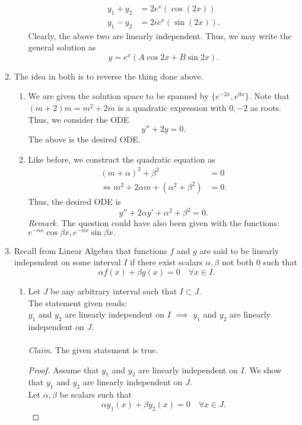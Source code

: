 \documentclass{article}
\begin{document}
\begin{enumerate}[label = Q.\arabic*.]
\begin{enumerate}[label = (\roman*)]
\begin{align*}
			y_1 + y_2 &= 2e^x(\cos(2x))\\
			y_1 - y_2 &= 2ie^x(\sin(2x)).
		\end{align*}
		Clearly, the above two are linearly independent. Thus, we may write the general solution as
		\[y = e^x(A\cos2x + B\sin 2x).\]
	\end{enumerate}
	\item The idea in both is to reverse the thing done above.
	\begin{enumerate}[label = (\roman*)] 
		\item We are given the solution space to be spanned by $\{e^{-2x}, e^{0x}\}.$ Note that $(m + 2)m = m^2 + 2m$ is a quadratic expression with $0, -2$ as roots. Thus, we consider the ODE
		\[y'' + 2y = 0.\]
		The above is the desired ODE.
		\item Like before, we construct the quadratic equation as
		\begin{align*} 
			(m + \alpha)^2 + \beta^2 &= 0\\
			\iff m^2 + 2\alpha m + (\alpha^2 + \beta^2) &= 0.
		\end{align*}
		Thus, the desired ODE is
		\[y'' + 2\alpha y' + \alpha^2 + \beta^2 = 0.\]
		\emph{Remark.} The question could have also been given with the functions: $e^{-\alpha x}\cos\beta x, e^{-\alpha x}\sin\beta x.$
	\end{enumerate}
	\item Recall from Linear Algebra that functions $f$ and $g$ are said to be linearly independent on some interval $I$ if there exist scalars $\alpha, \beta$ not both $0$ such that
	\[\alpha f(x) + \beta g(x) = 0 \quad \forall x \in I.\]
	\begin{enumerate}[label = (\roman*)] 
		\item Let $J$ be any arbitrary interval such that $I \subset J.$\\
		The statement given reads:\\
		$y_1$ and $y_2$ are linearly independent on $I$ $\implies$ $y_1$ and $y_2$ are linearly independent on $J.$\\\\
		\emph{Claim.} The given statement is true.
		\begin{proof} 
			Assume that $y_1$ and $y_2$ are linearly independent on $I.$ We show that $y_1$ and $y_2$ are linearly independent on $J.$\\
			Let $\alpha, \beta$ be scalars such that
			\begin{equation} \label{eq:linJ}
			\alpha y_1(x) + \beta y_2(x) = 0 \quad \forall x \in J.
			\end{equation}
				

\end{proof}
\end{enumerate}
\end{enumerate}
\end{document}
